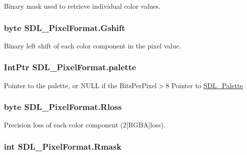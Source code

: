 Binary mask used to retrieve individual color values. 

\hypertarget{struct_s_d_l___pixel_format_afa974003c44cf2ce7bd5321cd337508f}{
\subsubsection[{Gshift}]{\setlength{\rightskip}{0pt plus 5cm}byte {\bf SDL\_\-PixelFormat.Gshift}}}
\label{struct_s_d_l___pixel_format_afa974003c44cf2ce7bd5321cd337508f}


Binary left shift of each color component in the pixel value. 

\hypertarget{struct_s_d_l___pixel_format_a5578b72f8e6c6b8f4feb8e9d67d7af04}{
\subsubsection[{palette}]{\setlength{\rightskip}{0pt plus 5cm}IntPtr {\bf SDL\_\-PixelFormat.palette}}}
\label{struct_s_d_l___pixel_format_a5578b72f8e6c6b8f4feb8e9d67d7af04}


Pointer to the palette, or NULL if the BitsPerPixel$>$8 Pointer to \hyperlink{struct_s_d_l___palette}{SDL\_\-Palette} 

\hypertarget{struct_s_d_l___pixel_format_a1e19f6685404bb72ce971d1f7483c8af}{
\subsubsection[{Rloss}]{\setlength{\rightskip}{0pt plus 5cm}byte {\bf SDL\_\-PixelFormat.Rloss}}}
\label{struct_s_d_l___pixel_format_a1e19f6685404bb72ce971d1f7483c8af}


Precision loss of each color component (2\mbox{[}RGBA\mbox{]}loss). 

\hypertarget{struct_s_d_l___pixel_format_a10124e3f1900188b3dac9dd618bdefc6}{
\subsubsection[{Rmask}]{\setlength{\rightskip}{0pt plus 5cm}int {\bf SDL\_\-PixelFormat.Rmask}}}
\label{struct_s_d_l___pixel_format_a10124e3f1900188b3dac9dd618bdefc6}


